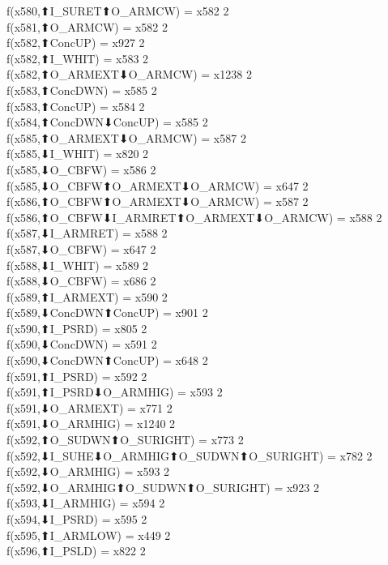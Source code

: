 f(x580,⬆I_SURET⬆O_ARMCW) = x582 {2} \\
f(x581,⬆O_ARMCW) = x582 {2} \\
f(x582,⬆ConcUP) = x927 {2} \\
f(x582,⬆I_WHIT) = x583 {2} \\
f(x582,⬆O_ARMEXT⬇O_ARMCW) = x1238 {2} \\
f(x583,⬆ConcDWN) = x585 {2} \\
f(x583,⬆ConcUP) = x584 {2} \\
f(x584,⬆ConcDWN⬇ConcUP) = x585 {2} \\
f(x585,⬆O_ARMEXT⬇O_ARMCW) = x587 {2} \\
f(x585,⬇I_WHIT) = x820 {2} \\
f(x585,⬇O_CBFW) = x586 {2} \\
f(x585,⬇O_CBFW⬆O_ARMEXT⬇O_ARMCW) = x647 {2} \\
f(x586,⬆O_CBFW⬆O_ARMEXT⬇O_ARMCW) = x587 {2} \\
f(x586,⬆O_CBFW⬇I_ARMRET⬆O_ARMEXT⬇O_ARMCW) = x588 {2} \\
f(x587,⬇I_ARMRET) = x588 {2} \\
f(x587,⬇O_CBFW) = x647 {2} \\
f(x588,⬇I_WHIT) = x589 {2} \\
f(x588,⬇O_CBFW) = x686 {2} \\
f(x589,⬆I_ARMEXT) = x590 {2} \\
f(x589,⬇ConcDWN⬆ConcUP) = x901 {2} \\
f(x590,⬆I_PSRD) = x805 {2} \\
f(x590,⬇ConcDWN) = x591 {2} \\
f(x590,⬇ConcDWN⬆ConcUP) = x648 {2} \\
f(x591,⬆I_PSRD) = x592 {2} \\
f(x591,⬆I_PSRD⬇O_ARMHIG) = x593 {2} \\
f(x591,⬇O_ARMEXT) = x771 {2} \\
f(x591,⬇O_ARMHIG) = x1240 {2} \\
f(x592,⬆O_SUDWN⬆O_SURIGHT) = x773 {2} \\
f(x592,⬇I_SUHE⬇O_ARMHIG⬆O_SUDWN⬆O_SURIGHT) = x782 {2} \\
f(x592,⬇O_ARMHIG) = x593 {2} \\
f(x592,⬇O_ARMHIG⬆O_SUDWN⬆O_SURIGHT) = x923 {2} \\
f(x593,⬇I_ARMHIG) = x594 {2} \\
f(x594,⬇I_PSRD) = x595 {2} \\
f(x595,⬆I_ARMLOW) = x449 {2} \\
f(x596,⬆I_PSLD) = x822 {2} \\
